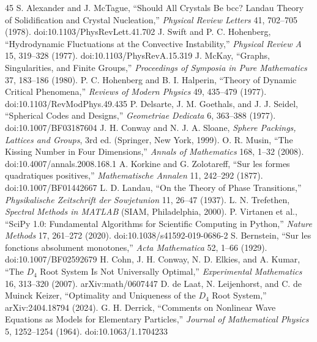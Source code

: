 \documentclass[11pt,a4paper]{article}
\begin{document}
\begin{thebibliography}{45}
 S. Alexander and J. McTague, ``Should All Crystals Be bcc? Landau Theory of Solidification and Crystal Nucleation,'' \emph{Physical Review Letters} 41, 702--705 (1978). doi:10.1103/PhysRevLett.41.702
 J. Swift and P. C. Hohenberg, ``Hydrodynamic Fluctuations at the Convective Instability,'' \emph{Physical Review A} 15, 319--328 (1977). doi:10.1103/PhysRevA.15.319
 J. McKay, ``Graphs, Singularities, and Finite Groups,'' \emph{Proceedings of Symposia in Pure Mathematics} 37, 183--186 (1980).
 P. C. Hohenberg and B. I. Halperin, ``Theory of Dynamic Critical Phenomena,'' \emph{Reviews of Modern Physics} 49, 435--479 (1977). doi:10.1103/RevModPhys.49.435
 P. Delsarte, J. M. Goethals, and J. J. Seidel, ``Spherical Codes and Designs,'' \emph{Geometriae Dedicata} 6, 363--388 (1977). doi:10.1007/BF03187604
 J. H. Conway and N. J. A. Sloane, \emph{Sphere Packings, Lattices and Groups}, 3rd ed. (Springer, New York, 1999).
 O. R. Musin, ``The Kissing Number in Four Dimensions,'' \emph{Annals of Mathematics} 168, 1--32 (2008). doi:10.4007/annals.2008.168.1
 A. Korkine and G. Zolotareff, ``Sur les formes quadratiques positives,'' \emph{Mathematische Annalen} 11, 242--292 (1877). doi:10.1007/BF01442667
 L. D. Landau, ``On the Theory of Phase Transitions,'' \emph{Physikalische Zeitschrift der Sowjetunion} 11, 26--47 (1937).
 L. N. Trefethen, \emph{Spectral Methods in MATLAB} (SIAM, Philadelphia, 2000).
 P. Virtanen et al., ``SciPy 1.0: Fundamental Algorithms for Scientific Computing in Python,'' \emph{Nature Methods} 17, 261--272 (2020). doi:10.1038/s41592-019-0686-2
 S. Bernstein, ``Sur les fonctions absolument monotones,'' \emph{Acta Mathematica} 52, 1--66 (1929). doi:10.1007/BF02592679
 H. Cohn, J. H. Conway, N. D. Elkies, and A. Kumar, ``The $D_4$ Root System Is Not Universally Optimal,'' \emph{Experimental Mathematics} 16, 313--320 (2007). arXiv:math/0607447
 D. de Laat, N. Leijenhorst, and C. de Muinck Keizer, ``Optimality and Uniqueness of the $D_4$ Root System,'' arXiv:2404.18794 (2024).
 G. H. Derrick, ``Comments on Nonlinear Wave Equations as Models for Elementary Particles,'' \emph{Journal of Mathematical Physics} 5, 1252--1254 (1964). doi:10.1063/1.1704233

\end{thebibliography}
\end{document}
